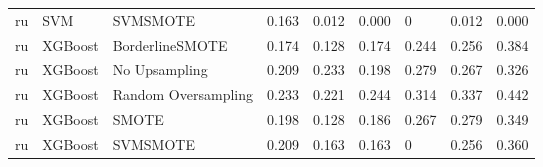 \begin{tabular}{lllllllll}
      ru &                          SVM &            SVMSMOTE & 0.163 &                     0.012 &                 0.000 &                      0 &                                   0.012 &     0.000 \\
      ru &                      XGBoost &     BorderlineSMOTE & 0.174 &                     0.128 &                 0.174 &                  0.244 &                                   0.256 &     0.384 \\
      ru &                      XGBoost &       No Upsampling & 0.209 &                     0.233 &                 0.198 &                  0.279 &                                   0.267 &     0.326 \\
      ru &                      XGBoost & Random Oversampling & 0.233 &                     0.221 &                 0.244 &                  0.314 &                                   0.337 &     0.442 \\
      ru &                      XGBoost &               SMOTE & 0.198 &                     0.128 &                 0.186 &                  0.267 &                                   0.279 &     0.349 \\
      ru &                      XGBoost &            SVMSMOTE & 0.209 &                     0.163 &                 0.163 &                      0 &                                   0.256 &     0.360 \\
\bottomrule
\end{tabular}
